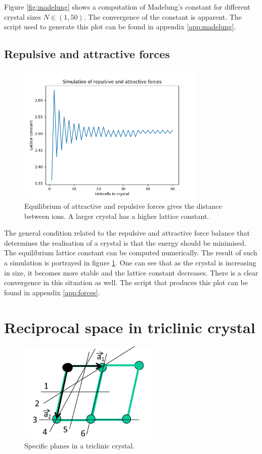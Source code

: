 \documentclass[10pt, a4paper]{amsart}
\begin{document}
Figure \ref{fig:madelung} shows a computation of Madelung's constant for different crystal sizes $N \in (1, 50)$. The convergence of the constant is apparent. The script used to generate this plot can be found in appendix \ref{app:madelung}.

\subsection{Repulsive and attractive forces}

\begin{figure}
	\centering
	\includegraphics[width=0.8\textwidth]{./figures/forces.png}
	\caption{Equilibrium of attractive and repulsive forces gives the distance between ions. A larger crystal has a higher lattice constant.}
	\label{fig:forces}
\end{figure}

The general condition related to the repulsive and attractive force balance that determines the realisation of a crystal is that the energy should be minimised. The equilibrium lattice constant can be computed numerically. The result of such a simulation is portrayed in figure \ref{fig:forces}. One can see that as the crystal is increasing in size, it becomes more stable and the lattice constant decreases. There is a clear convergence in this situation as well. The script that produces this plot can be found in appendix \ref{app:forces}.


\section{Reciprocal space in triclinic crystal}

\begin{figure}
	\centering
	\includegraphics[width = 0.6\textwidth]{./figures/problem4.png}
	\caption{Specific planes in a triclinic crystal.}
	\label{fig:triclinic}
\end{figure}
\end{document}
